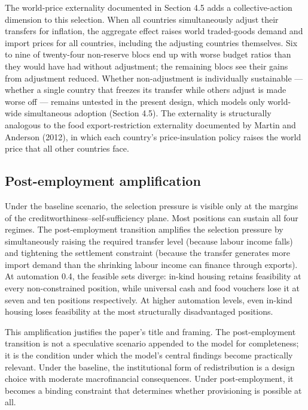 \documentclass[preprint,review,12pt]{elsarticle}
\begin{document}
The world-price externality documented in Section 4.5 adds a
collective-action dimension to this selection. When all countries
simultaneously adjust their transfers for inflation, the aggregate
effect raises world traded-goods demand and import prices for all
countries, including the adjusting countries themselves. Six to nine of
twenty-four non-reserve blocs end up with worse budget ratios than they
would have had without adjustment; the remaining blocs see their gains
from adjustment reduced. Whether non-adjustment is individually
sustainable --- whether a single country that freezes its transfer while
others adjust is made worse off --- remains untested in the present
design, which models only world-wide simultaneous adoption (Section
4.5). The externality is structurally analogous to the food
export-restriction externality documented by Martin and Anderson (2012),
in which each country's price-insulation policy raises the world price
that all other countries face.

\subsection{Post-employment amplification}

Under the baseline scenario, the selection pressure is visible only at
the margins of the creditworthiness--self-sufficiency plane. Most
positions can sustain all four regimes. The post-employment transition
amplifies the selection pressure by simultaneously raising the required
transfer level (because labour income falls) and tightening the
settlement constraint (because the transfer generates more import demand
than the shrinking labour income can finance through exports). At
automation 0.4, the feasible sets diverge: in-kind housing retains
feasibility at every non-constrained position, while universal cash and
food vouchers lose it at seven and ten positions respectively. At higher
automation levels, even in-kind housing loses feasibility at the most
structurally disadvantaged positions.

This amplification justifies the paper's title and framing. The
post-employment transition is not a speculative scenario appended to the
model for completeness; it is the condition under which the model's
central findings become practically relevant. Under the baseline, the
institutional form of redistribution is a design choice with moderate
macrofinancial consequences. Under post-employment, it becomes a binding
constraint that determines whether provisioning is possible at all.
\end{document}
